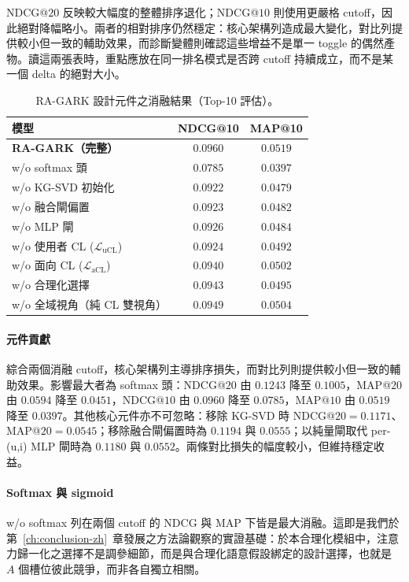 NDCG@$20$ 反映較大幅度的整體排序退化；NDCG@$10$ 則使用更嚴格 cutoff，因此絕對降幅略小。兩者的相對排序仍然穩定：核心架構列造成最大變化，對比列提供較小但一致的輔助效果，而診斷變體則確認這些增益不是單一 toggle 的偶然產物。讀這兩張表時，重點應放在同一排名模式是否跨 cutoff 持續成立，而不是某一個 delta 的絕對大小。

\begin{table}[H]
\centering
\caption{RA-GARK 設計元件之消融結果（Top-10 評估）。}
\label{tab:ablation@10}
\begin{tabular}{lcc}
\toprule
模型 & NDCG@10 & MAP@10 \\
\midrule
\textbf{RA-GARK（完整）}              & $\mathbf{0.0960}$ & $\mathbf{0.0519}$ \\
\midrule
w/o softmax 頭                 & $0.0785$ & $0.0397$ \\
w/o KG-SVD 初始化              & $0.0922$ & $0.0479$ \\
w/o 融合閘偏置                 & $0.0923$ & $0.0482$ \\
w/o MLP 閘                     & $0.0926$ & $0.0484$ \\
\midrule
w/o 使用者 CL ($\mathcal{L}_{\mathrm{uCL}}$)  & $0.0924$ & $0.0492$ \\
w/o 面向 CL ($\mathcal{L}_{\mathrm{aCL}}$) & $0.0940$ & $0.0502$ \\
\midrule
w/o 合理化選擇                & $0.0943$ & $0.0495$ \\
w/o 全域視角（純 CL 雙視角）   & $0.0949$ & $0.0504$ \\
\bottomrule
\end{tabular}
\end{table}
\FloatBarrier

\paragraph{元件貢獻} 綜合兩個消融 cutoff，核心架構列主導排序損失，而對比列則提供較小但一致的輔助效果。影響最大者為 softmax 頭：NDCG@$20$ 由 $0.1243$ 降至 $0.1005$，MAP@$20$ 由 $0.0594$ 降至 $0.0451$，NDCG@$10$ 由 $0.0960$ 降至 $0.0785$，MAP@$10$ 由 $0.0519$ 降至 $0.0397$。其他核心元件亦不可忽略：移除 KG-SVD 時 NDCG@$20 = 0.1171$、MAP@$20 = 0.0545$；移除融合閘偏置時為 $0.1194$ 與 $0.0555$；以純量閘取代 per-(u,i) MLP 閘時為 $0.1180$ 與 $0.0552$。兩條對比損失的幅度較小，但維持穩定收益。

\paragraph{Softmax 與 sigmoid} w/o softmax 列在兩個 cutoff 的 NDCG 與 MAP 下皆是最大消融。這即是我們於第~\ref{ch:conclusion-zh}~章發展之方法論觀察的實證基礎：於本合理化模組中，注意力歸一化之選擇不是調參細節，而是與合理化語意假設綁定的設計選擇，也就是 $A$ 個槽位彼此競爭，而非各自獨立相關。

